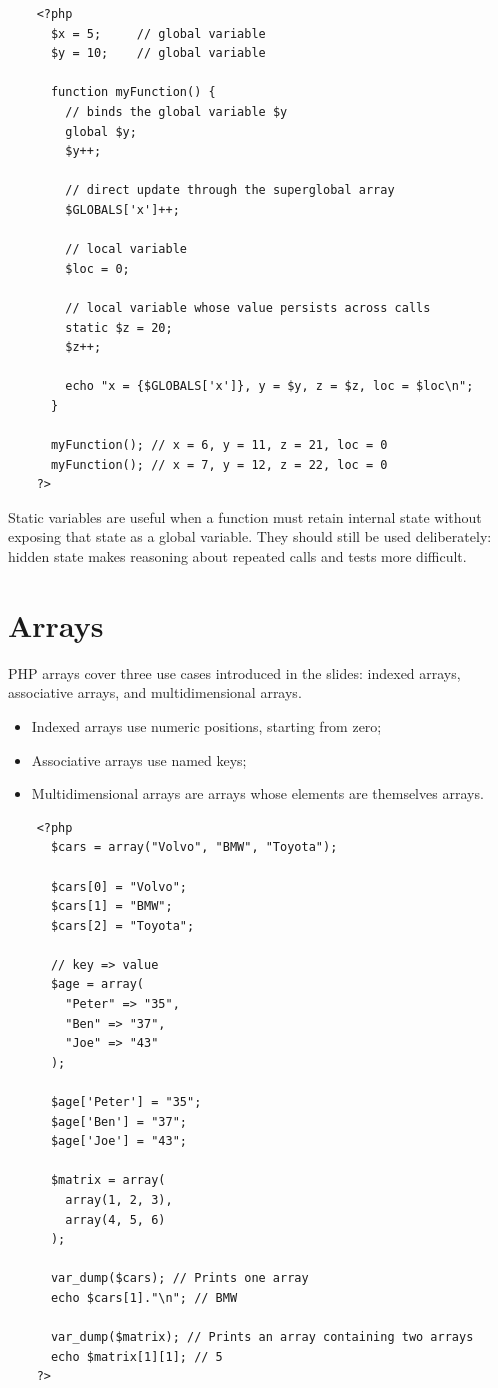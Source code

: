 \documentclass{scrbook}
\begin{document}
	\begin{lstlisting}
	<?php
	  $x = 5;     // global variable
	  $y = 10;    // global variable
	
	  function myFunction() {
		// binds the global variable $y
		global $y;
		$y++;
		
		// direct update through the superglobal array
		$GLOBALS['x']++;
		
		// local variable
		$loc = 0;
		
		// local variable whose value persists across calls
		static $z = 20;
		$z++;
		
		echo "x = {$GLOBALS['x']}, y = $y, z = $z, loc = $loc\n";
	  }
	
	  myFunction(); // x = 6, y = 11, z = 21, loc = 0
	  myFunction(); // x = 7, y = 12, z = 22, loc = 0
	?>
	\end{lstlisting}
	
	Static variables are useful when a function must retain internal state without exposing that state as a global variable. They should still be used deliberately: hidden state makes reasoning about repeated calls and tests more difficult.
	
	\section{Arrays}
	
	PHP arrays cover three use cases introduced in the slides: indexed arrays, associative arrays, and multidimensional arrays.
	\begin{itemize}
		\item Indexed arrays use numeric positions, starting from zero;
		\item Associative arrays use named keys;
		\item Multidimensional arrays are arrays whose elements are themselves arrays.
	\end{itemize}
	
	\begin{lstlisting}
	<?php
	  $cars = array("Volvo", "BMW", "Toyota");
		
	  $cars[0] = "Volvo";
	  $cars[1] = "BMW";
	  $cars[2] = "Toyota";
		
	  // key => value
	  $age = array(
	 	"Peter" => "35",
		"Ben" => "37",
		"Joe" => "43"
	  );
		
	  $age['Peter'] = "35";
	  $age['Ben'] = "37";
	  $age['Joe'] = "43";
		
	  $matrix = array(
		array(1, 2, 3),
		array(4, 5, 6)
	  );
	  
	  var_dump($cars); // Prints one array
	  echo $cars[1]."\n"; // BMW
	  
	  var_dump($matrix); // Prints an array containing two arrays
	  echo $matrix[1][1]; // 5
	?>
	\end{lstlisting}
	
\end{document}
